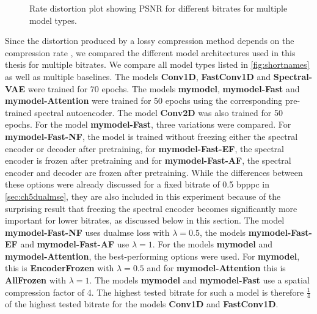 \begin{figure}[!ht]
\caption{Rate distortion plot showing PSNR for different bitrates for multiple model types.}
\label{fig:ratedistortion}
\end{figure}

Since the distortion produced by a lossy compression method depends on the compression rate \citep{berger_rate-distortion_2003}, we compared the different model architectures used in this thesis for multiple bitrates. We compare all model types listed in \autoref{fig:shortnames} as well as multiple baselines. The models \textbf{Conv1D}, \textbf{FastConv1D} and \textbf{Spectral-VAE} were trained for 70 epochs. The models \textbf{\ac{mymodel}}, \textbf{\ac{mymodel}-Fast} and \textbf{\ac{mymodel}-Attention} were trained for 50 epochs using the corresponding pre-trained spectral autoencoder. The model \textbf{Conv2D} was also trained for 50 epochs. For the model \textbf{\ac{mymodel}-Fast}, three variations were compared. For \textbf{\ac{mymodel}-Fast-NF}, the model is trained without freezing either the spectral encoder or decoder after pretraining, for \textbf{\ac{mymodel}-Fast-EF}, the spectral encoder is frozen after pretraining and for \textbf{\ac{mymodel}-Fast-AF}, the spectral encoder and decoder are frozen after pretraining. While the differences between these options were already discussed for a fixed bitrate of 0.5 bpppc in \autoref{sec:ch5dualmse}, they are also included in this experiment because of the surprising result that freezing the spectral encoder becomes significantly more important for lower bitrates, as discussed below in this section. The model \textbf{\ac{mymodel}-Fast-NF} uses \ac{dualmse} loss with $\lambda=0.5$, the models \textbf{\ac{mymodel}-Fast-EF} and \textbf{\ac{mymodel}-Fast-AF} use $\lambda=1$. For the models \textbf{\ac{mymodel}} and \textbf{\ac{mymodel}-Attention}, the best-performing options were used. For \textbf{\ac{mymodel}}, this is \textbf{EncoderFrozen} with $\lambda=0.5$ and for \textbf{\ac{mymodel}-Attention} this is \textbf{AllFrozen} with $\lambda=1$. The models \textbf{\ac{mymodel}} and \textbf{\ac{mymodel}-Fast} use a spatial compression factor of 4. The highest tested bitrate for such a model is therefore $\frac{1}{4}$ of the highest tested bitrate for the models \textbf{Conv1D} and \textbf{FastConv1D}.

